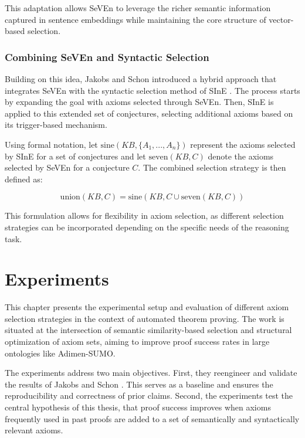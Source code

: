 \documentclass[english,version-2020-11]{uzl-thesis}
\begin{document}
This adaptation allows SeVEn to leverage the richer semantic information captured in sentence embeddings while maintaining the core structure of vector-based selection.

\subsection{Combining SeVEn and Syntactic Selection}

Building on this idea, Jakobs and Schon introduced a hybrid approach that integrates SeVEn with the syntactic selection method of SInE \cite{Schon2024}. The process starts by expanding the goal with axioms selected through SeVEn. Then, SInE is applied to this extended set of conjectures, selecting additional axioms based on its trigger-based mechanism. 

Using formal notation, let \( \text{sine}(KB, \{A_1, ..., A_n\}) \) represent the axioms selected by SInE for a set of conjectures and let \( \text{seven}(KB, C) \) denote the axioms selected by SeVEn for a conjecture \( C \). The combined selection strategy is then defined as:

\begin{definition}
    \begin{equation}
        \text{union}(KB, C) = \text{sine}(KB, C \cup \text{seven}(KB, C))
    \end{equation}
\end{definition}

This formulation allows for flexibility in axiom selection, as different selection strategies can be incorporated depending on the specific needs of the reasoning task.


\chapter{Experiments}
\label{chapter-experiments}

This chapter presents the experimental setup and evaluation of different axiom selection strategies in the context of automated theorem proving. The work is situated at the intersection of semantic similarity-based selection and structural optimization of axiom sets, aiming to improve proof success rates in large ontologies like Adimen-SUMO.

The experiments address two main objectives. First, they reengineer and validate the results of Jakobs and Schon \cite{Schon2024}. This serves as a baseline and ensures the reproducibility and correctness of prior claims. Second, the experiments test the central hypothesis of this thesis, that proof success improves when axioms frequently used in past proofs are added to a set of semantically and syntactically relevant axioms.
\end{document}
